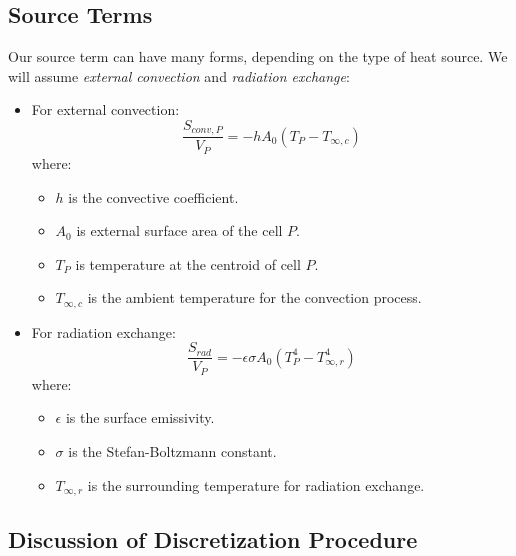 \documentclass[14pt]{article}
\begin{document}
\subsection{Source Terms}
\label{sec:orgbca249a}
Our source term can have many forms, depending on the type of heat source. We will assume \emph{external convection}
and \emph{radiation exchange}:
\begin{itemize}
\item For external convection:
\begin{equation}
\frac{S_{conv,P}}{V_P} = -hA_0(T_P-T_{\infty,c})
\end{equation}
where:
\begin{itemize}
\item \(h\) is the convective coefficient.
\item \(A_0\) is external surface area of the cell \(P\).
\item \(T_P\) is temperature at the centroid of cell \(P\).
\item \(T_{\infty,c}\) is the ambient temperature for the convection process.
\end{itemize}
\item For radiation exchange:
\begin{equation}
\frac{S_{rad}}{V_P} = -\epsilon \sigma A_0(T_P^4 - T_{\infty,r}^4)
\end{equation}
where:
\begin{itemize}
\item \(\epsilon\) is the surface emissivity.
\item \(\sigma\) is the Stefan-Boltzmann constant.
\item \(T_{\infty,r}\) is the surrounding temperature for radiation exchange.
\end{itemize}
\end{itemize}
\subsection{Discussion of Discretization Procedure}
\label{sec:org2324503}
\end{document}
